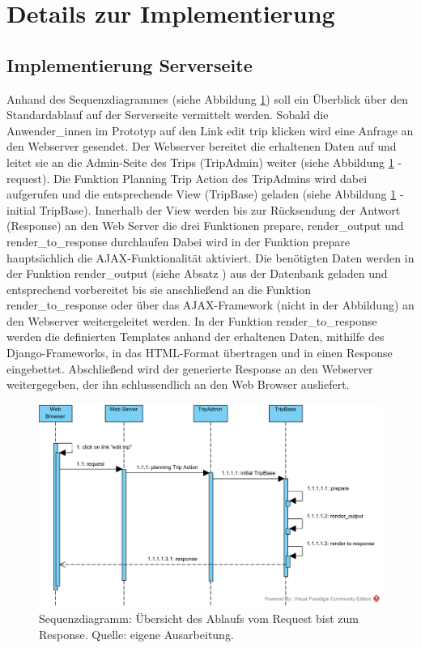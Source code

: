 \documentclass[Bachelorarbeit.tex]{subfiles}
\begin{document}
\section{Details zur Implementierung}
\label{chap:implementierung:sec:details}

\subsection{Implementierung Serverseite}
\label{implServer}
Anhand des Sequenzdiagrammes (siehe Abbildung \ref{fig:Overview}) soll ein  Überblick über den Standardablauf auf der Serverseite vermittelt werden. 
Sobald die Anwender\_innen im  Prototyp auf den Link edit trip klicken wird eine  Anfrage an den Webserver gesendet.
Der Webserver bereitet die erhaltenen Daten auf und leitet sie an die Admin-Seite des Trips (TripAdmin) weiter (siehe Abbildung \ref{fig:Overview} - request). 
Die Funktion Planning Trip Action des TripAdmins wird dabei aufgerufen und die entsprechende View (TripBase) geladen (siehe Abbildung \ref{fig:Overview} - initial TripBase).
Innerhalb der View werden bis zur Rücksendung der Antwort (Response) an den Web Server die drei Funktionen prepare, render\_output und render\_to\_response durchlaufen
Dabei wird in der Funktion prepare hauptsächlich die \ac{AJAX}-Funktionalität aktiviert.
Die benötigten Daten werden in der Funktion render\_output (siehe Absatz ) aus der Datenbank geladen und entsprechend vorbereitet bis sie anschließend an die Funktion render\_to\_response oder über das \ac{AJAX}-Framework (nicht in der Abbildung) an den Webserver weitergeleitet werden.
In der Funktion render\_to\_response werden die definierten Templates anhand der erhaltenen Daten, mithilfe des Django-Frameworks, in das \ac{HTML}-Format übertragen und in einen Response eingebettet.
Abschließend wird der generierte Response an den Webserver weitergegeben, der ihn schlussendlich an den Web Browser ausliefert.


\begin{figure}[h]
\centering
\includegraphics[width=1\linewidth]{img/Implementierung/Overview}
\caption[k]{Sequenzdiagramm: Übersicht des Ablaufs vom Request bist zum Response. Quelle: eigene Ausarbeitung.}
\label{fig:Overview}
\end{figure}
\end{document}
